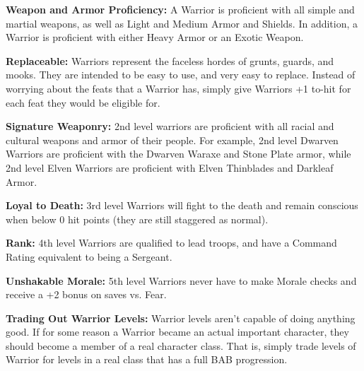 \textbf{Weapon and Armor Proficiency:} A Warrior is proficient with all simple and martial weapons, as well as Light and Medium Armor and Shields. In addition, a Warrior is proficient with either Heavy Armor or an Exotic Weapon.

\textbf{Replaceable:} Warriors represent the faceless hordes of grunts, guards, and mooks. They are intended to be easy to use, and very easy to replace. Instead of worrying about the feats that a Warrior has, simply give Warriors +1 to-hit for each feat they would be eligible for.

\textbf{Signature Weaponry:} 2nd level warriors are proficient with all racial and cultural weapons and armor of their people. For example, 2nd level Dwarven Warriors are proficient with the Dwarven Waraxe and Stone Plate armor, while 2nd level Elven Warriors are proficient with Elven Thinblades and Darkleaf Armor.

\textbf{Loyal to Death:} 3rd level Warriors will fight to the death and remain conscious when below 0 hit points (they are still staggered as normal).

\textbf{Rank:} 4th level Warriors are qualified to lead troops, and have a Command Rating equivalent to being a Sergeant.

\textbf{Unshakable Morale:} 5th level Warriors never have to make Morale checks and receive a +2 bonus on saves vs. Fear.

\textbf{Trading Out Warrior Levels:} Warrior levels aren't capable of doing anything good. If for some reason a Warrior became an actual important character, they should become a member of a real character class. That is, simply trade levels of Warrior for levels in a real class that has a full BAB progression.
